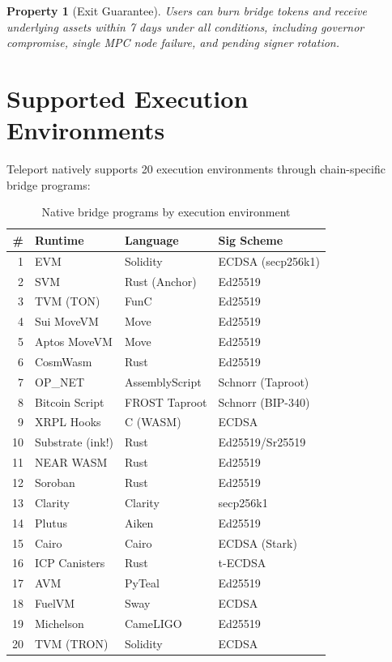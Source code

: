 \documentclass[11pt,twocolumn]{article}
\newtheorem{property}[theorem]{Property}
\begin{document}
\begin{property}[Exit Guarantee]
Users can burn bridge tokens and receive underlying assets within 7 days under all conditions, including governor compromise, single MPC node failure, and pending signer rotation.
\end{property}

\section{Supported Execution Environments}

Teleport natively supports 20 execution environments through chain-specific bridge programs:

\begin{table}[h]
\centering
\scriptsize
\begin{tabular}{rlll}
\toprule
\textbf{\#} & \textbf{Runtime} & \textbf{Language} & \textbf{Sig Scheme} \\
\midrule
1 & EVM & Solidity & ECDSA (secp256k1) \\
2 & SVM & Rust (Anchor) & Ed25519 \\
3 & TVM (TON) & FunC & Ed25519 \\
4 & Sui MoveVM & Move & Ed25519 \\
5 & Aptos MoveVM & Move & Ed25519 \\
6 & CosmWasm & Rust & Ed25519 \\
7 & OP\_NET & AssemblyScript & Schnorr (Taproot) \\
8 & Bitcoin Script & FROST Taproot & Schnorr (BIP-340) \\
9 & XRPL Hooks & C (WASM) & ECDSA \\
10 & Substrate (ink!) & Rust & Ed25519/Sr25519 \\
11 & NEAR WASM & Rust & Ed25519 \\
12 & Soroban & Rust & Ed25519 \\
13 & Clarity & Clarity & secp256k1 \\
14 & Plutus & Aiken & Ed25519 \\
15 & Cairo & Cairo & ECDSA (Stark) \\
16 & ICP Canisters & Rust & t-ECDSA \\
17 & AVM & PyTeal & Ed25519 \\
18 & FuelVM & Sway & ECDSA \\
19 & Michelson & CameLIGO & Ed25519 \\
20 & TVM (TRON) & Solidity & ECDSA \\
\bottomrule
\end{tabular}
\caption{Native bridge programs by execution environment}
\label{tab:runtimes}
\end{table}
\end{document}
